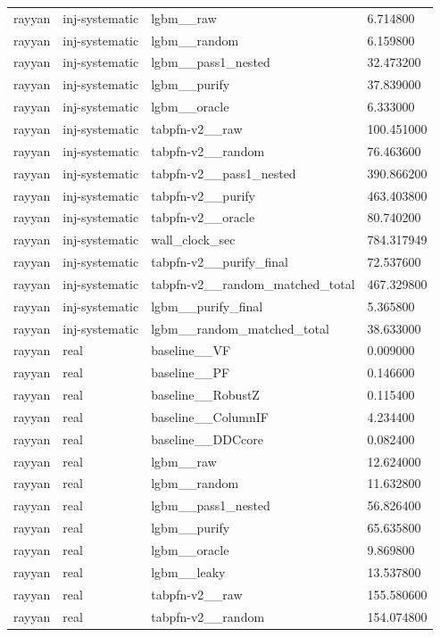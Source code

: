 \begin{tabular}{llll}
rayyan & inj-systematic & lgbm\_\_raw & 6.714800 \\
rayyan & inj-systematic & lgbm\_\_random & 6.159800 \\
rayyan & inj-systematic & lgbm\_\_pass1\_nested & 32.473200 \\
rayyan & inj-systematic & lgbm\_\_purify & 37.839000 \\
rayyan & inj-systematic & lgbm\_\_oracle & 6.333000 \\
rayyan & inj-systematic & tabpfn-v2\_\_raw & 100.451000 \\
rayyan & inj-systematic & tabpfn-v2\_\_random & 76.463600 \\
rayyan & inj-systematic & tabpfn-v2\_\_pass1\_nested & 390.866200 \\
rayyan & inj-systematic & tabpfn-v2\_\_purify & 463.403800 \\
rayyan & inj-systematic & tabpfn-v2\_\_oracle & 80.740200 \\
rayyan & inj-systematic & wall\_clock\_sec & 784.317949 \\
rayyan & inj-systematic & tabpfn-v2\_\_purify\_final & 72.537600 \\
rayyan & inj-systematic & tabpfn-v2\_\_random\_matched\_total & 467.329800 \\
rayyan & inj-systematic & lgbm\_\_purify\_final & 5.365800 \\
rayyan & inj-systematic & lgbm\_\_random\_matched\_total & 38.633000 \\
rayyan & real & baseline\_\_VF & 0.009000 \\
rayyan & real & baseline\_\_PF & 0.146600 \\
rayyan & real & baseline\_\_RobustZ & 0.115400 \\
rayyan & real & baseline\_\_ColumnIF & 4.234400 \\
rayyan & real & baseline\_\_DDCcore & 0.082400 \\
rayyan & real & lgbm\_\_raw & 12.624000 \\
rayyan & real & lgbm\_\_random & 11.632800 \\
rayyan & real & lgbm\_\_pass1\_nested & 56.826400 \\
rayyan & real & lgbm\_\_purify & 65.635800 \\
rayyan & real & lgbm\_\_oracle & 9.869800 \\
rayyan & real & lgbm\_\_leaky & 13.537800 \\
rayyan & real & tabpfn-v2\_\_raw & 155.580600 \\
rayyan & real & tabpfn-v2\_\_random & 154.074800 \\

\end{tabular}
